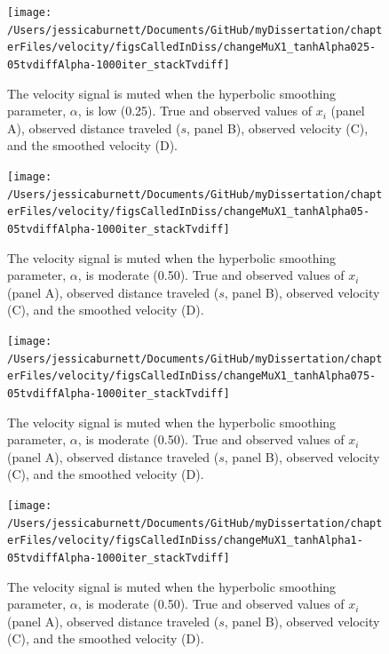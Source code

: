 \documentclass[12pt,twoside,openany]{reedthesis}
\begin{document}
\newpage
\begin{figure}[bth]

{\centering \texttt{[image: /Users/jessicaburnett/Documents/GitHub/myDissertation/chapterFiles/velocity/figsCalledInDiss/changeMuX1\_tanhAlpha025-05tvdiffAlpha-1000iter\_stackTvdiff]} 

}

\caption{The velocity signal is muted when the  hyperbolic smoothing parameter, $\alpha$, is low (0.25). True and observed values of $x_i$ (panel A), observed distance traveled ($s$, panel B), observed velocity (C), and the smoothed velocity (D). }\label{fig:mu1varpt25}
\end{figure}
\newpage
\begin{figure}[bth]

{\centering \texttt{[image: /Users/jessicaburnett/Documents/GitHub/myDissertation/chapterFiles/velocity/figsCalledInDiss/changeMuX1\_tanhAlpha05-05tvdiffAlpha-1000iter\_stackTvdiff]} 

}

\caption{The velocity signal is muted when the  hyperbolic smoothing parameter, $\alpha$, is moderate (0.50). True and observed values of $x_i$ (panel A), observed distance traveled ($s$, panel B), observed velocity (C), and the smoothed velocity (D). }\label{fig:mu1varpt5}
\end{figure}
\newpage
\begin{figure}[bth]

{\centering \texttt{[image: /Users/jessicaburnett/Documents/GitHub/myDissertation/chapterFiles/velocity/figsCalledInDiss/changeMuX1\_tanhAlpha075-05tvdiffAlpha-1000iter\_stackTvdiff]} 

}

\caption{The velocity signal is muted when the  hyperbolic smoothing parameter, $\alpha$, is moderate (0.50). True and observed values of $x_i$ (panel A), observed distance traveled ($s$, panel B), observed velocity (C), and the smoothed velocity (D). }\label{fig:mu1varpt75}
\end{figure}
\newpage
\begin{figure}[bth]

{\centering \texttt{[image: /Users/jessicaburnett/Documents/GitHub/myDissertation/chapterFiles/velocity/figsCalledInDiss/changeMuX1\_tanhAlpha1-05tvdiffAlpha-1000iter\_stackTvdiff]} 

}

\caption{The velocity signal is muted when the  hyperbolic smoothing parameter, $\alpha$, is moderate (0.50). True and observed values of $x_i$ (panel A), observed distance traveled ($s$, panel B), observed velocity (C), and the smoothed velocity (D). }\label{fig:mu1var1}
\end{figure}
\end{document}
